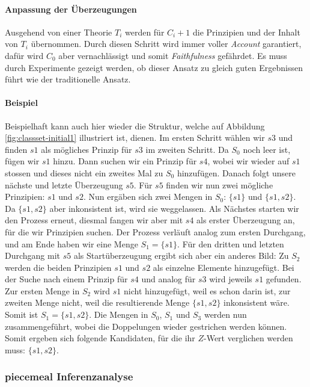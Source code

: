 \documentclass{article}
\begin{document}
\paragraph{Anpassung der Überzeugungen}
Ausgehend von einer Theorie $T_i$ werden für $C_i+1$ die Prinzipien und der Inhalt von $T_i$ übernommen.
Durch diesen Schritt wird immer voller \textit{Account} garantiert, dafür wird $C_0$ aber vernachlässigt und somit \textit{Faithfulness} gefährdet. Es muss durch Experimente gezeigt werden, ob dieser Ansatz zu gleich guten Ergebnissen führt wie der traditionelle Ansatz.

\paragraph{Beispiel}
Beispielhaft kann auch hier wieder die Struktur, welche auf Abbildung \ref{fig:classset-initial1} illustriert ist, dienen. Im ersten Schritt wählen wir $s3$ und finden $s1$ als mögliches Prinzip für $s3$ im zweiten Schritt. Da $S_0$ noch leer ist, fügen wir $s1$ hinzu. Dann suchen wir ein Prinzip für $s4$, wobei wir wieder auf $s1$ stossen und dieses nicht ein zweites Mal zu $S_0$ hinzufügen. Danach folgt unsere nächste und letzte Überzeugung $s5$. Für $s5$ finden wir nun zwei mögliche Prinzipien: $s1$ und $s2$. Nun ergäben sich zwei Mengen in $S_0$: $\{s1\}$ und $\{s1, s2\}$. Da $\{s1, s2\}$ aber inkonsistent ist, wird sie weggelassen. Als Nächstes starten wir den Prozess erneut, diesmal fangen wir aber mit $s4$ als erster Überzeugung an, für die wir Prinzipien suchen. Der Prozess verläuft analog zum ersten Durchgang, und am Ende haben wir eine Menge $S_1 = \{s1\}$. Für den dritten und letzten Durchgang mit $s5$ als Startüberzeugung ergibt sich aber ein anderes Bild: Zu $S_2$ werden die beiden Prinzipien $s1$ und $s2$ als einzelne Elemente hinzugefügt. Bei der Suche nach einem Prinzip für $s4$ und analog für $s3$ wird jeweils $s1$ gefunden. Zur ersten Menge in $S_2$ wird $s1$ nicht hinzugefügt, weil es schon darin ist, zur zweiten Menge nicht, weil die resultierende Menge $\{s1,s2\}$ inkonsistent wäre. Somit ist $S_1 = \{{s1}, {s2}\}$. Die Mengen in $S_0$, $S_1$ und $S_3$ werden nun zusammengeführt, wobei die Doppelungen wieder gestrichen werden können. Somit ergeben sich folgende Kandidaten, für die ihr $Z$-Wert verglichen werden muss: $\{{s1}, {s2}\}$.

\subsubsection{piecemeal Inferenzanalyse}
\end{document}
